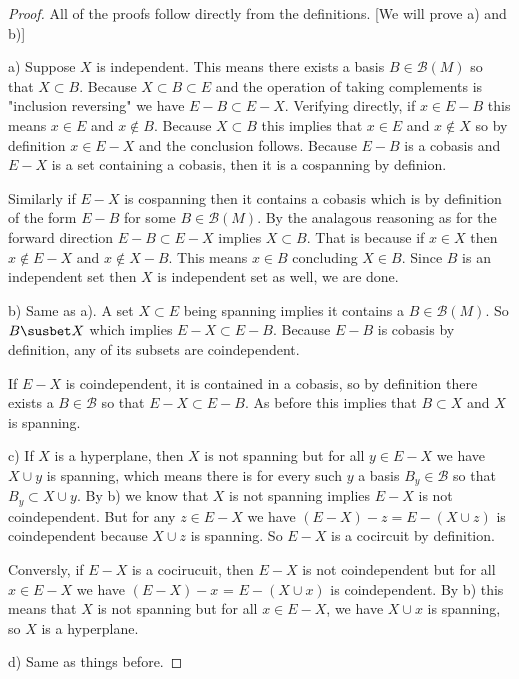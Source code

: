 \begin{proof}
    All of the proofs follow directly from the definitions. [We will prove a) and b)]

    a) Suppose $X$ is independent. This means there exists a basis $B \in \mathcal{B}(M)$ so that $X \subset B$. Because $X \subset B \subset E$ and the operation of taking complements is "inclusion reversing" we have $E-B \subset E - X$. Verifying directly, if $x \in E - B$ this means $x \in E$ and $x \notin B$. Because $X \subset B$ this implies that $x \in E$ and $x \notin X$ so by definition $x \in E - X$ and the conclusion follows. Because $E - B$ is a cobasis and $E - X$ is a set containing a cobasis, then it is a cospanning by definion.

    Similarly if $E - X$ is cospanning then it contains a cobasis which is by definition of the form $E - B$ for some $B \in \mathcal{B}(M)$. By the analagous reasoning as for the forward direction $E - B \subset E - X$ implies $X \subset B$. That is because if $x \in X$ then $x \notin E - X$ and $x \notin X - B$. This means $x \in B$ concluding $X \in B$. Since $B$ is an independent set then $X$ is independent set as well, we are done.

    b) Same as a). A set $X\subset E$ being spanning implies it contains a $B \in \mathcal{B}(M)$. So  $B \susbet X$ which implies $E - X \subset E - B$. Because $E - B$ is cobasis by definition, any of its subsets are coindependent. 

    If $E - X$ is coindependent, it is contained in a cobasis, so by definition there exists a $B \in \mathcal{B}$ so that $E - X \subset E - B$. As before this implies that $B \subset X$ and $X$ is spanning.

    c)  If $X$ is a hyperplane, then $X$ is not spanning but for all $y \in E - X$ we have $X \cup y$ is spanning, which means there is for every such $y$ a basis $B_y \in \mathcal{B}$ so that $B_y \subset X \cup y $. By b) we know that $X$ is not spanning implies $E - X$ is not coindependent. But for any $z \in E - X$ we have $(E-X)-z = E - (X \cup z)$ is coindependent because $X \cup z$ is spanning. So $E - X$ is a cocircuit by definition.

    Conversly, if $E - X$ is a cocirucuit, then $E-X$ is not coindependent but for all $x \in E - X$ we have $(E - X) - x$ = $E - (X \cup x)$ is coindependent. By b) this means that $X$ is not spanning but for all $x \in E-X$, we have $X \cup x$ is spanning, so $X$ is a hyperplane.

    d) Same as things before.
\end{proof}\\

